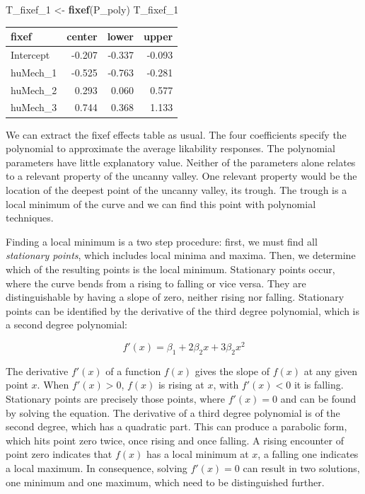 \documentclass[]{svmono}
\newenvironment{Shaded}{\begin{snugshade}}{\end{snugshade}}
\newcommand{\KeywordTok}[1]{\textcolor[rgb]{0.13,0.29,0.53}{\textbf{#1}}}
\newcommand{\DecValTok}[1]{\textcolor[rgb]{0.00,0.00,0.81}{#1}}
\newcommand{\StringTok}[1]{\textcolor[rgb]{0.31,0.60,0.02}{#1}}
\newcommand{\NormalTok}[1]{#1}
\begin{document}
\begin{Shaded}
\begin{Highlighting}[]
\NormalTok{T_fixef_}\DecValTok{1}\NormalTok{ <-}\StringTok{ }\KeywordTok{fixef}\NormalTok{(P_poly)}
\NormalTok{T_fixef_}\DecValTok{1}
\end{Highlighting}
\end{Shaded}

\begin{longtable}[]{@{}lrrr@{}}
\toprule
fixef & center & lower & upper\tabularnewline
\midrule
\endhead
Intercept & -0.207 & -0.337 & -0.093\tabularnewline
huMech\_1 & -0.525 & -0.763 & -0.281\tabularnewline
huMech\_2 & 0.293 & 0.060 & 0.577\tabularnewline
huMech\_3 & 0.744 & 0.368 & 1.133\tabularnewline
\bottomrule
\end{longtable}

We can extract the fixef effects table as usual. The four coefficients
specify the polynomial to approximate the average likability responses.
The polynomial parameters have little explanatory value. Neither of the
parameters alone relates to a relevant property of the uncanny valley.
One relevant property would be the location of the deepest point of the
uncanny valley, its trough. The trough is a local minimum of the curve
and we can find this point with polynomial techniques.

Finding a local minimum is a two step procedure: first, we must find all
\emph{stationary points}, which includes local minima and maxima. Then,
we determine which of the resulting points is the local minimum.
Stationary points occur, where the curve bends from a rising to falling
or vice versa. They are distinguishable by having a slope of zero,
neither rising nor falling. Stationary points can be identified by the
derivative of the third degree polynomial, which is a second degree
polynomial:

\[f'(x) = \beta_1 + 2\beta_2x + 3\beta_2x^2\]

The derivative \(f'(x)\) of a function \(f(x)\) gives the slope of
\(f(x)\) at any given point \(x\). When \(f'(x) > 0\), \(f(x)\) is
rising at \(x\), with \(f'(x) < 0\) it is falling. Stationary points are
precisely those points, where \(f'(x) = 0\) and can be found by solving
the equation. The derivative of a third degree polynomial is of the
second degree, which has a quadratic part. This can produce a parabolic
form, which hits point zero twice, once rising and once falling. A
rising encounter of point zero indicates that \(f(x)\) has a local
minimum at \(x\), a falling one indicates a local maximum. In
consequence, solving \(f'(x) = 0\) can result in two solutions, one
minimum and one maximum, which need to be distinguished further.
\end{document}
